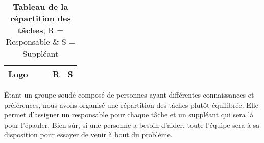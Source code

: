 \documentclass[12pt]{article}
\begin{document}
\begin{table}[ht]
\begin{tabular}{|l||*{4}{c|}}
                        \hline
                        \textbf{Logo} & & & \cellcolor{red!50} R & \cellcolor{cyan!60} S
                       
                        \\
                        \hline
                    \end{tabular}
                    \caption{\textbf{Tableau de la répartition des tâches}, R = Responsable \& S = Suppléant}
                \end{table}
                
                \par Étant un groupe soudé composé de personnes ayant différentes connaissances et préférences, nous avons organisé une répartition des tâches plutôt équilibrée. Elle permet d'assigner un responsable pour chaque tâche et un suppléant qui sera là pour l'épauler. Bien sûr, si une personne a besoin d'aider, toute l'équipe sera à sa disposition pour essayer de venir à bout du problème.
                
                \clearpage
\end{document}
